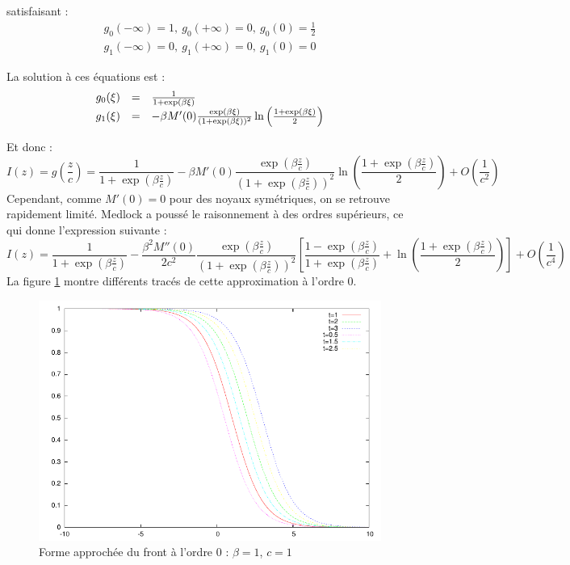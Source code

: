 \documentclass{article}
\begin{document}
satisfaisant :
\begin{equation}
\begin{array}{c}
	g_0(-\infty)=1,\ g_0(+\infty)=0,\ g_0(0)=\frac{1}{2}\\
	g_1(-\infty)=0,\ g_1(+\infty)=0,\ g_1(0)=0
\end{array}
\end{equation}

La solution à ces équations est :
\begin{equation}
\begin{array}{r c l}
	g_0(\xi)&=&\frac{1}{1+\exp(\beta\xi)}\\
	g_1(\xi)&=&-\beta M'(0)\frac{\exp(\beta \xi)}{(1+\exp(\beta\xi))^2}\ln\left(\frac{1+\exp(\beta\xi)}{2}\right)
\end{array}
\end{equation}

Et donc :
\[I(z)=g\left(\frac{z}{c}\right)=\frac{1}{1+\exp\left(\beta\frac{z}{c}\right)}-\beta M'(0)\frac{\exp\left(\beta \frac{z}{c}\right)}{\left(1+\exp\left(\beta\frac{z}{c}\right)\right)^2}\ln\left(\frac{1+\exp\left(\beta\frac{z}{c}\right)}{2}\right)+O\left(\frac{1}{c^2}\right)\]
Cependant, comme $M'(0)=0$ pour des noyaux symétriques, on se retrouve rapidement limité. Medlock a poussé le raisonnement à des ordres supérieurs, ce qui donne l'expression suivante :
\[I(z)=\frac{1}{1+\exp\left(\beta\frac{z}{c}\right)}-\frac{\beta^2 M''(0)}{2c^2}\frac{\exp\left(\beta \frac{z}{c}\right)}{\left(1+\exp\left(\beta\frac{z}{c}\right)\right)^2}\left[\frac{1-\exp\left(\beta\frac{z}{c}\right)}{1+\exp\left(\beta\frac{z}{c}\right)}+\ln\left(\frac{1+\exp\left(\beta\frac{z}{c}\right)}{2}\right)\right]+O\left(\frac{1}{c^4}\right)\]
La figure \ref{plotShape} montre différents tracés de cette approximation à l'ordre 0.

\begin{figure}[!h]
	\centering
	\includegraphics[scale=1]{img/plotShape.pdf}
\caption{Forme approchée du front à l'ordre 0 : $\beta=1$, $c=1$}
\label{plotShape}
\end{figure}
\end{document}
